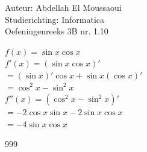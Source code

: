 \documentclass[a4paper]{article}
\begin{document}
  
\noindent \large Auteur: Abdellah El Moussaoui \\
\noindent \large Studierichting: Informatica\\
\noindent \large Oefeningenreeks 3B nr. 1.10\\

\medskip

\normalsize

$f(x)=\sin x \cos x$\\

$ f'(x)=\left(\sin x \cos x\right)'$\\

$= \left(\sin x\right)'\cos x + \sin x \left(\cos x\right)'$\\

$= \cos^2 x - \sin^2 x $\\

$ f''(x)=\left(\cos^2 x - \sin^2 x\right)'$\\

$ = -2 \cos x \sin x - 2 \sin x \cos x$\\

$ = -4 \sin x \cos x$


\begin{thebibliography}{999}
\end{thebibliography}
\end{document}

